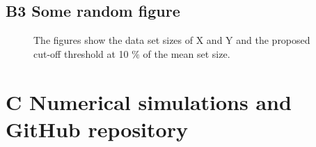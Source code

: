 \newpage
\section*{\large{B3 \quad Some random figure}}
\vspace*{1cm}

\begin{figure}[H]
  \centering
  \hfill
  \caption[Data set sizes]{The figures show the data set sizes of X and Y and the proposed cut-off threshold at 10 $\%$ of the mean set size.}
\end{figure}


\chapter*{C \quad Numerical simulations and GitHub repository}



